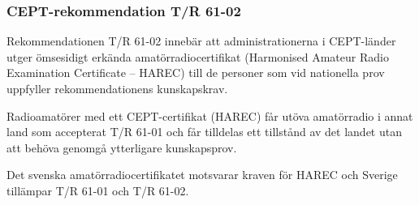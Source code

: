 \subsubsection{CEPT-rekommendation T/R 61-02}

Rekommendationen T/R 61-02 \cite{TR6102} innebär att administrationerna i
CEPT-länder utger ömsesidigt erkända amatörradiocertifikat (Harmonised Amateur
Radio Examination Certificate -- HAREC) till de personer som vid nationella
prov uppfyller rekommendationens kunskapskrav.

Radioamatörer med ett CEPT-certifikat (HAREC) får utöva amatörradio i annat
land som accepterat T/R 61-01 och får tilldelas ett tillstånd av det landet
utan att behöva genomgå ytterligare kunskapsprov.

Det svenska amatörradiocertifikatet motsvarar kraven för HAREC och Sverige
tillämpar T/R 61-01 och T/R 61-02.
